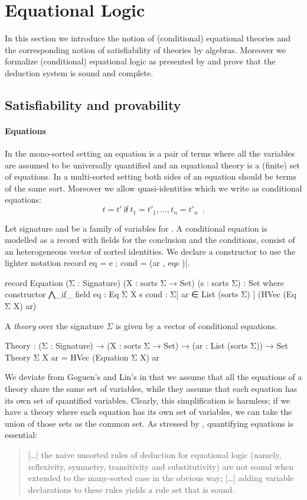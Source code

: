 \section{Equational Logic}
\label{sec:eqlog}

In this section we introduce the notion of (conditional) equational
theories and the corresponding notion of satisfiability of theories
by algebras. Moreover we formalize (conditional) equational logic as
presented by \cite{goguen2005specifying} and prove that
the deduction system is sound and complete.

\subsection{Satisfiability and provability}

\paragraph*{Equations} In the mono-sorted setting an equation is a pair
of terms where all the variables are assumed to be universally
quantified and an equational theory is a (finite) set of equations.
In a  multi-sorted setting both sides of an equation should be terms
of the same sort. Moreover we allow quasi-identities which we
write as conditional equations:
\[ t = t'\ \mathsf{if} \  t_1 = t'_1, \ldots, t_n = t'_n \enspace . \]

Let signature  and  be a family of variables
for . A conditional equation is modelled as a record
with fields for the conclusion and the conditions, consist of an
heterogeneous vector of sorted identities. We declare a constructor to
use the lighter notation record { eq = e ; cond = (ar , eqs )}|.
\begin{spec}
record Equation (Σ : Signature) (X : sorts Σ → Set) (s : sorts Σ) : Set where
  constructor ⋀_if_
  field
    eq     :   Eq Σ X s
    cond   :   Σ[ ar ∈ List (sorts Σ) ] (HVec (Eq Σ X) ar)
\end{spec}
\noindent A \emph{theory} over the signature $\Sigma$ is given by a
vector of conditional equations.
\begin{spec}
Theory : (Σ : Signature) → (X : sorts Σ → Set) → (ar : List (sorts Σ)) → Set
Theory Σ X ar = HVec (Equation Σ X) ar
\end{spec}
We deviate from Goguen's and Lin's in that we assume that all the
equations of a theory share the same set of variables, while they
assume that each equation has its own set of quantified
variables. Clearly, this simplification is harmless; if we have a
theory where each equation has its own set of variables, we can take
the union of those sets as the common set. As stressed by
\cite{goguen-remarks-87}, quantifying equations is essential:
\begin{quote}
  [\ldots] the naive unsorted rules of deduction for equational logic
  (namely, reflexivity, symmetry, transitivity and substitutivity) are
  not sound when extended to the many-sorted case in the obvious way;
  [\ldots] adding variable declarations to these rules
  yields a rule set that is sound.
\end{quote}

